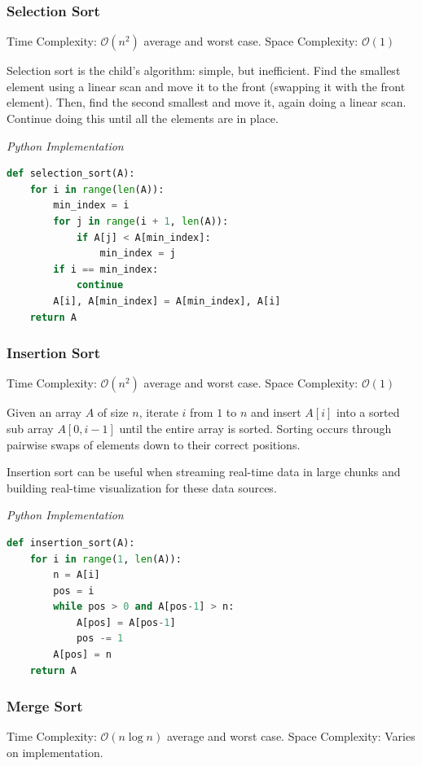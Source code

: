\documentclass{article}
\newcommand{\bigO}{\mathcal{O}}
\begin{document}
    \subsubsection{Selection Sort}
    Time Complexity: $\bigO(n^2)$ average and worst case. Space Complexity: $\bigO (1)$
    
    Selection sort is the child's algorithm: simple, but inefficient. Find the smallest element using a linear scan and move it to the front (swapping it with the front element). Then, find the second smallest and move it, again doing a linear scan. Continue doing this until all the elements are in place. 

\vspace{8pt} \emph{Python Implementation}
\begin{lstlisting}[language=Python]
def selection_sort(A):
    for i in range(len(A)):
        min_index = i
        for j in range(i + 1, len(A)):
            if A[j] < A[min_index]:
                min_index = j
        if i == min_index:
            continue
        A[i], A[min_index] = A[min_index], A[i]
    return A
\end{lstlisting}
    
    \subsubsection{Insertion Sort}
    Time Complexity: $\bigO(n^2)$ average and worst case. Space Complexity: $\bigO(1)$
    
    Given an array $A$ of size $n$, iterate $i$ from $1$ to $n$ and insert $A[i]$ into a sorted sub array $A[0, i-1]$ until the entire array is sorted. Sorting occurs through pairwise swaps of elements down to their correct positions.
    
    Insertion sort can be useful when streaming real-time data in large chunks and building real-time visualization for these data sources.

\vspace{8pt} \emph{Python Implementation}
\begin{lstlisting}[language=Python]
def insertion_sort(A):
    for i in range(1, len(A)):
        n = A[i]
        pos = i
        while pos > 0 and A[pos-1] > n:
            A[pos] = A[pos-1]
            pos -= 1
        A[pos] = n
    return A
\end{lstlisting}

    \subsubsection{Merge Sort}
    Time Complexity: $\bigO( n \log n )$ average and worst case. Space Complexity: Varies on implementation. 
    
\end{document}
